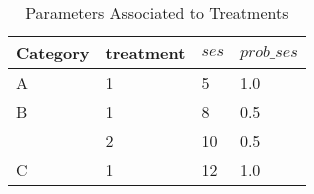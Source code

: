\begin{table}[h]
\begin{tabular}{llll}
\hline
\multicolumn{1}{|l|}{Category} & \multicolumn{1}{l|}{treatment} & \multicolumn{1}{l|}{$ses$} & \multicolumn{1}{l|}{$prob\_ses$} \\ \hline
A                              & 1                              & 5                          & 1.0                              \\
B                              & 1                              & 8                          & 0.5                              \\
                               & 2                              & 10                         & 0.5                              \\
C                              & 1                              & 12                         & 1.0                                
\end{tabular}
\caption{Parameters Associated to Treatments}
\end{table}	

